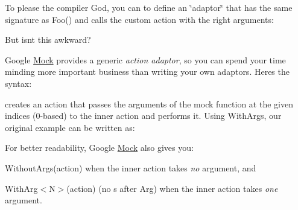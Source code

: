 To please the compiler God, you can to define an \char`\"{}adaptor\char`\"{} that has the same signature as {\ttfamily Foo()} and calls the custom action with the right arguments\+:


\begin{DoxyCode}{0}
\DoxyCodeLine{}
\DoxyCodeLine{\}}
\DoxyCodeLine{}
\end{DoxyCode}


But isn\textquotesingle{}t this awkward?

Google \mbox{\hyperlink{class_mock}{Mock}} provides a generic {\itshape action adaptor}, so you can spend your time minding more important business than writing your own adaptors. Here\textquotesingle{}s the syntax\+:


\begin{DoxyCode}{0}
\end{DoxyCode}


creates an action that passes the arguments of the mock function at the given indices (0-\/based) to the inner {\ttfamily action} and performs it. Using {\ttfamily With\+Args}, our original example can be written as\+:


\begin{DoxyCode}{0}
\end{DoxyCode}


For better readability, Google \mbox{\hyperlink{class_mock}{Mock}} also gives you\+:


\begin{DoxyItemize}
\item {\ttfamily Without\+Args(action)} when the inner {\ttfamily action} takes {\itshape no} argument, and
\item {\ttfamily With\+Arg$<$N$>$(action)} (no {\ttfamily s} after {\ttfamily Arg}) when the inner {\ttfamily action} takes {\itshape one} argument.
\end{DoxyItemize}

